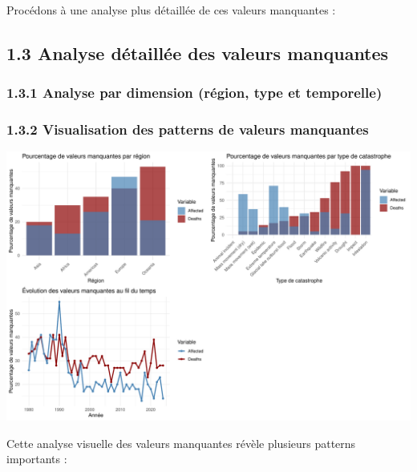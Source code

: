 \documentclass[
]{article}
\begin{document}
Procédons à une analyse plus détaillée de ces valeurs manquantes :

\subsection{1.3 Analyse détaillée des valeurs
manquantes}\label{analyse-duxe9tailluxe9e-des-valeurs-manquantes}

\subsubsection{1.3.1 Analyse par dimension (région, type et
temporelle)}\label{analyse-par-dimension-ruxe9gion-type-et-temporelle}

\subsubsection{1.3.2 Visualisation des patterns de valeurs
manquantes}\label{visualisation-des-patterns-de-valeurs-manquantes}

\includegraphics{Projet_ML_files/figure-latex/missing_plots-1.pdf}

Cette analyse visuelle des valeurs manquantes révèle plusieurs patterns
importants :
\end{document}
